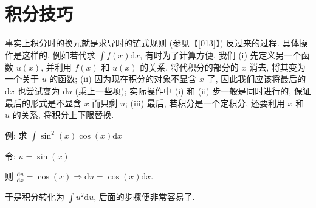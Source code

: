 \section{积分技巧}\label{020}

\begin{tcolorbox}[size=fbox, breakable, enhanced jigsaw, title={换元 (substitution)}]

事实上积分时的换元就是求导时的链式规则 (参见【\ref{013}】) 反过来的过程.
具体操作是这样的, 例如若代求 \(\int f(x)\mathrm{d}x\), 有时为了计算方便,
我们 (i) 先定义另一个函数 \(u(x)\), 并利用 \(f(x)\) 和 \(u(x)\) 的关系,
将代积分的部分的 \(x\) 消去, 将其变为一个关于 \(u\) 的函数; (ii)
因为现在积分的对象不显含 \(x\) 了, 因此我们应该将最后的 \(\mathrm{d}x\)
也尝试变为 \(\mathrm{d}u\) (乘上一些项); 实际操作中 (i) 和 (ii)
步一般是同时进行的, 保证最后的形式是不显含 \(x\) 而只剩 \(u\); (iii)
最后, 若积分是一个定积分, 还要利用 \(x\) 和 \(u\) 的关系,
将积分上下限替换.

\begin{newquote}
例: 求 \(\int\sin^2(x)\cos(x)\mathrm{d}x\)

令: \(u=\sin(x)\)

则
\(\frac{\mathrm{d}u}{\mathrm{d}x}=\cos(x)\Rightarrow\mathrm{d}u=\cos(x)\mathrm{d}x\).

于是积分转化为 \(\int u^2\mathrm{d}u\), 后面的步骤便非常容易了.
\end{newquote}

\end{tcolorbox}

